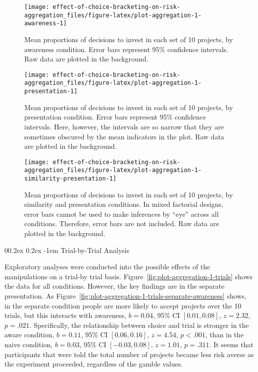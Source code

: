 \documentclass[
  english,
  man, donotrepeattitle,floatsintext]{apa7}
\makeatletter
\let\oldparagraph\paragraph
\renewcommand{\paragraph}[1]{\oldparagraph{#1}\mbox{}}
\renewcommand{\paragraph}{\@startsection{paragraph}{4}{\parindent}%
  {0\baselineskip \@plus 0.2ex \@minus 0.2ex}%
  {-1em}%
  {\normalfont\normalsize\bfseries\itshape\typesectitle}}
\theoremstyle{definition}
\theoremstyle{definition}
\theoremstyle{definition}
\theoremstyle{definition}
\theoremstyle{remark}
\makeatother
\begin{document}
\begin{figure}
\texttt{[image: effect-of-choice-bracketing-on-risk-aggregation\_files/figure-latex/plot-aggregation-1-awareness-1]} \caption{Mean proportions of decisions to invest in each set of 10 projects, by awareness condition. Error bars represent 95\% confidence intervals. Raw data are plotted in the background.}\label{fig:plot-aggregation-1-awareness}
\end{figure}



\begin{figure}
\texttt{[image: effect-of-choice-bracketing-on-risk-aggregation\_files/figure-latex/plot-aggregation-1-presentation-1]} \caption{Mean proportions of decisions to invest in each set of 10 projects, by presentation condition. Error bars represent 95\% confidence intervals. Here, however, the intervals are so narrow that they are sometimes obscured by the mean indicators in the plot. Raw data are plotted in the background.}\label{fig:plot-aggregation-1-presentation}
\end{figure}



\begin{figure}
\texttt{[image: effect-of-choice-bracketing-on-risk-aggregation\_files/figure-latex/plot-aggregation-1-similarity-presentation-1]} \caption{Mean proportions of decisions to invest in each set of 10 projects, by similarity and presentation conditions. In mixed factorial designs, error bars cannot be used to make inferences by ``eye'' across all conditions. Therefore, error bars are not included. Raw data are plotted in the background.}\label{fig:plot-aggregation-1-similarity-presentation}
\end{figure}

\hypertarget{trial-by-trial-analysis}{%
\paragraph{Trial-by-Trial Analysis}\label{trial-by-trial-analysis}}

Exploratory analyses were conducted into the possible effects of the
manipulations on a trial-by trial basis.
Figure~\ref{fig:plot-aggregation-1-trials} shows the data for all conditions.
However, the key findings are in the separate presentation. As
Figure~\ref{fig:plot-aggregation-1-trials-separate-awareness} shows, in the
separate condition people are more likely to accept projects over the 10 trials,
but this interacts with awareness,
\(b = 0.04\), 95\% CI \([0.01, 0.08]\), \(z = 2.32\), \(p = .021\).
Specifically, the relationship between choice and trial is stronger in the aware
condition,
\(b = 0.11\), 95\% CI \([0.06, 0.16]\), \(z = 4.54\), \(p < .001\), than in the
naive condition,
\(b = 0.03\), 95\% CI \([-0.03, 0.08]\), \(z = 1.01\), \(p = .311\). It seems that
participants that were told the total number of projects became less risk averse
as the experiment proceeded, regardless of the gamble values.
\end{document}
